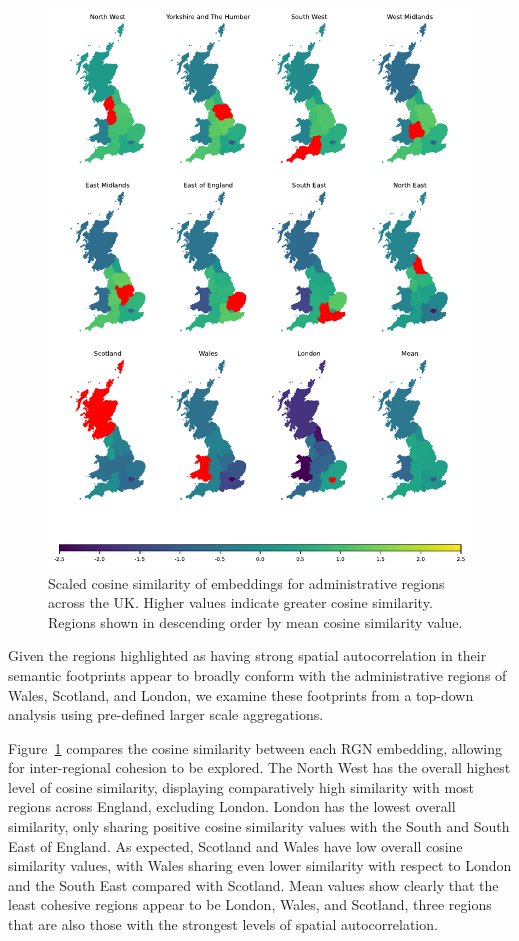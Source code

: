 \documentclass[
  letterpaper,
  11pt,
  english,
  onehalfspacing,
  headsepline]{MastersDoctoralThesis}
\begin{document}
\begin{figure}

{\centering \includegraphics{05_footprint/05_figures/fig-similarity-output-1.pdf}

}

\caption{\label{fig-similarity}Scaled cosine similarity of embeddings
for administrative regions across the UK. Higher values indicate greater
cosine similarity. Regions shown in descending order by mean cosine
similarity value.}

\end{figure}

Given the regions highlighted as having strong spatial autocorrelation
in their semantic footprints appear to broadly conform with the
administrative regions of Wales, Scotland, and London, we examine these
footprints from a top-down analysis using pre-defined larger scale
aggregations.

Figure~\ref{fig-similarity} compares the cosine similarity between each
RGN embedding, allowing for inter-regional cohesion to be explored. The
North West has the overall highest level of cosine similarity,
displaying comparatively high similarity with most regions across
England, excluding London. London has the lowest overall similarity,
only sharing positive cosine similarity values with the South and South
East of England. As expected, Scotland and Wales have low overall cosine
similarity values, with Wales sharing even lower similarity with respect
to London and the South East compared with Scotland. Mean values show
clearly that the least cohesive regions appear to be London, Wales, and
Scotland, three regions that are also those with the strongest levels of
spatial autocorrelation.
\end{document}
